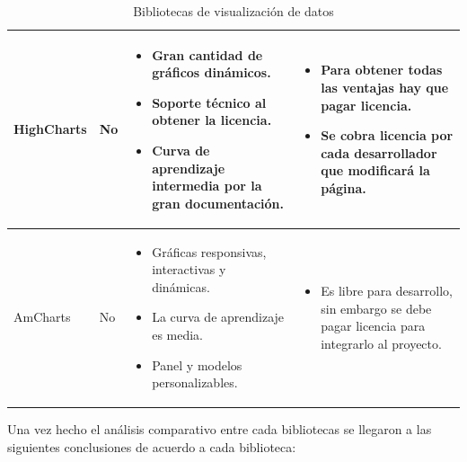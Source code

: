 \begin{table}[ht]
{\begin{tabular}{ |p{2.5cm}|p{2.5cm}|p{4cm}|p{4cm}|  }
            HighCharts & No & \begin{itemize}[left=0pt]
                                  \item Gran cantidad de gráficos dinámicos.
                                  \item Soporte técnico al obtener la licencia.
                                  \item Curva de aprendizaje intermedia por la gran documentación.
                                \end{itemize} & \begin{itemize}[left=0pt]
                                                    \item Para obtener todas las ventajas hay que pagar licencia.
                                                    \item Se cobra licencia por cada desarrollador que modificará la página.
                                                  \end{itemize} \\
            \hline
            
            AmCharts & No & \begin{itemize}[left=0pt]
                               \item Gráficas responsivas, interactivas y dinámicas.
                               \item La curva de aprendizaje es media.
                               \item Panel y modelos personalizables.
                             \end{itemize} & \begin{itemize}[left=0pt]
                                               \item Es libre para desarrollo, sin embargo se debe pagar licencia para integrarlo al proyecto.
                                             \end{itemize} \\
            \hline
        \end{tabular}%
    }
    \caption{Bibliotecas de visualización de datos}
\end{table}

Una vez hecho el análisis comparativo entre cada bibliotecas se llegaron a las siguientes conclusiones de acuerdo a cada biblioteca:

